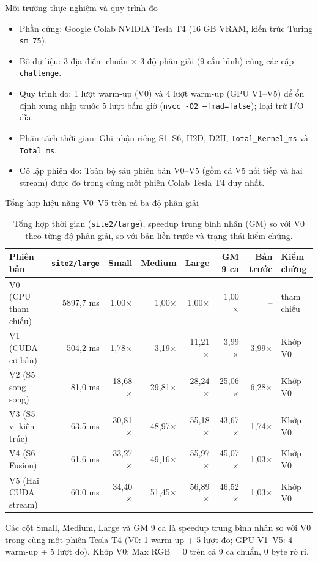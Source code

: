 \begin{frame}{Môi trường thực nghiệm và quy trình đo}
\begin{itemize}
\item Phần cứng: Google Colab NVIDIA Tesla T4 (16 GB VRAM, kiến trúc Turing \texttt{sm\_75}).
\item Bộ dữ liệu: 3 địa điểm chuẩn $\times$ 3 độ phân giải (9 cấu hình) cùng các cặp \texttt{challenge}.
\item Quy trình đo: 1 lượt warm-up (V0) và 4 lượt warm-up (GPU V1--V5) để ổn định xung nhịp trước 5 lượt bấm giờ (\texttt{nvcc -O2 --fmad=false}); loại trừ I/O đĩa.
\item Phân tách thời gian: Ghi nhận riêng S1--S6, H2D, D2H, \texttt{Total\_Kernel\_ms} và \texttt{Total\_ms}.
\item Cô lập phiên đo: Toàn bộ sáu phiên bản V0--V5 (gồm cả V5 nối tiếp và hai stream) được đo trong cùng một phiên Colab Tesla T4 duy nhất.
\end{itemize}
\end{frame}

\begin{frame}{Tổng hợp hiệu năng V0--V5 trên cả ba độ phân giải}
\begin{table}
\centering
\caption{Tổng hợp thời gian (\texttt{site2/large}), speedup trung bình nhân (GM) so với V0 theo từng độ phân giải, so với bản liền trước và trạng thái kiểm chứng.}
\scriptsize
\setlength{\tabcolsep}{4pt}
\begin{tabular}{lrrrrrrl}
\toprule
Phiên bản & \texttt{site2/large} & Small & Medium & Large & GM 9 ca & Bản trước & Kiểm chứng \\
\midrule
V0 (CPU tham chiếu) & 5897,7 ms & 1,00$\times$ & 1,00$\times$ & 1,00$\times$ & 1,00$\times$ & -- & tham chiếu \\
V1 (CUDA cơ bản) & 504,2 ms & 1,78$\times$ & 3,19$\times$ & 11,21$\times$ & 3,99$\times$ & 3,99$\times$ & Khớp V0 \\
V2 (S5 song song) & 81,0 ms & 18,68$\times$ & 29,81$\times$ & 28,24$\times$ & 25,06$\times$ & 6,28$\times$ & Khớp V0 \\
V3 (S5 vi kiến trúc) & 63,5 ms & 30,81$\times$ & 48,97$\times$ & 55,18$\times$ & 43,67$\times$ & 1,74$\times$ & Khớp V0 \\
V4 (S6 Fusion) & 61,6 ms & 33,27$\times$ & 49,16$\times$ & 55,97$\times$ & 45,07$\times$ & 1,03$\times$ & Khớp V0 \\
V5 (Hai CUDA stream) & 60,0 ms & 34,40$\times$ & 51,45$\times$ & 56,89$\times$ & 46,52$\times$ & 1,03$\times$ & Khớp V0 \\
\bottomrule
\end{tabular}
\end{table}

\scriptsize Các cột Small, Medium, Large và GM 9 ca là speedup trung bình nhân so với V0 trong cùng một phiên Tesla T4 (V0: 1 warm-up + 5 lượt đo; GPU V1--V5: 4 warm-up + 5 lượt đo). Khớp V0: Max RGB = 0 trên cả 9 ca chuẩn, 0 byte rò rỉ.
\end{frame}

